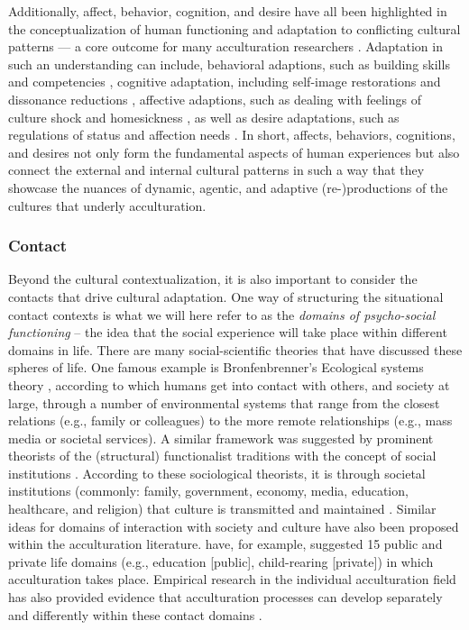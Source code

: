 \documentclass[man, 12pt, a4paper, mask]{apa7}
\begin{document}
Additionally, affect, behavior, cognition, and desire have all been highlighted in the conceptualization of human functioning and adaptation to conflicting cultural patterns --- a core outcome for many acculturation researchers \citep[e.g., see][]{Berry2006a, Searle1990, Ward2001, Maertz2016}. Adaptation in such an understanding can include, behavioral adaptions, such as building skills and competencies \citep[e.g.,][]{Bevan1965}, cognitive adaptation, including self-image restorations and dissonance reductions \citep[e.g.,][]{Czajkowska2017}, affective adaptions, such as dealing with feelings of culture shock and homesickness \citep[e.g.,][]{Smith1990, VanTilburg1996}, as well as desire adaptations, such as regulations of status and affection needs \citep[e.g.,][]{Steverink2006}. In short, affects, behaviors, cognitions, and desires not only form the fundamental aspects of human experiences but also connect the external and internal cultural patterns in such a way that they showcase the nuances of dynamic, agentic, and adaptive (re-)productions of the cultures that underly acculturation.

\subsubsection{Contact}
Beyond the cultural contextualization, it is also important to consider the contacts that drive cultural adaptation. One way of structuring the situational contact contexts is what we will here refer to as the \textit{domains of psycho-social functioning} -- the idea that the social experience will take place within different domains in life. There are many social-scientific theories that have discussed these spheres of life. One famous example is Bronfenbrenner's Ecological systems theory \citep{Bronfenbrenner1992}, according to which humans get into contact with others, and society at large, through a number of environmental systems that range from the closest relations (e.g., family or colleagues) to the more remote relationships (e.g., mass media or societal services). A similar framework was suggested by prominent theorists of the (structural) functionalist traditions with the concept of social institutions \citep[e.g.,][]{Turner1997}. According to these sociological theorists, it is through societal institutions (commonly: family, government, economy, media, education, healthcare, and religion) that culture is transmitted and maintained \citep[e.g.,][]{Durkheim1982}. Similar ideas for domains of interaction with society and culture have also been proposed within the acculturation literature. \citet{Arends-Toth2006, Arends-Toth2007} have, for example, suggested 15 public and private life domains (e.g., education [public], child-rearing [private]) in which acculturation takes place. Empirical research in the individual acculturation field has also provided evidence that acculturation processes can develop separately and differently within these contact domains \citep[e.g.,][]{Arends-Toth2003a}. 
\end{document}
